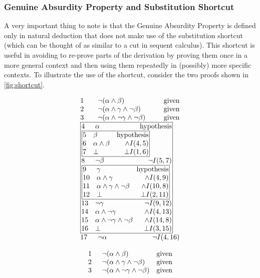 \documentclass[11pt,twoside,a4paper]{report}
\begin{document}
\subsubsection{Genuine Absurdity Property and Substitution Shortcut}
A very important thing to note is that the Genuine Absurdity Property is defined only in natural deduction that does not make use of the substitution shortcut (which can be thought of as similar to a cut in sequent calculus). This shortcut is useful in avoiding to re-prove parts of the derivation by proving them once in a more general context and then using them repeatedly in (possibly) more specific contexts. To illustrate the use of the shortcut, consider the two proofs shown in \autoref{fig:shortcut}.

\begin{figure}[htp]
\begin{minipage}[c]{.5\linewidth}
\[\vbox{\offinterlineskip\halign{
&\tabskip=1.5em#\strut&$#$\hfil\tabskip=1em&\hfil$#$\tabskip=0em\cr
%
1&\neg(\alpha\wedge\beta)&\mbox{given}\cr
2&\neg(\alpha\wedge\gamma\wedge\neg\beta)&\mbox{given}\cr
3&\neg(\alpha\wedge\neg\gamma\wedge\neg\beta)&\mbox{given}\cr
%
\multispan3\vbox{\halign{
\vrule#&&\hskip.1em\tabskip=1em#\strut&$#$\hfil\tabskip=1em&\hfil$#$\hskip0.1em\tabskip=0em&\vrule#\cr
\noalign{\hrule}
%
&4&\alpha&\mbox{hypothesis}&\cr
%
&\multispan3\,\vbox{\halign{
\vrule#&&\hskip.1em\tabskip=1em#\strut&$#$\hfil\tabskip=1em&\hfil$#$\hskip0.1em\tabskip=0em&\vrule#\cr
\noalign{\hrule}
%
&5&\beta&\mbox{hypothesis}&\cr
&6&\alpha\wedge\beta&\wedge I(4,5)&\cr
&7&\bot&\bot I(1,6)&\cr
%
\noalign{\hrule}}}\,&\cr
%
&8&\neg\beta&\neg I(5,7)&\cr
%
&\multispan3\,\vbox{\halign{
\vrule#&&\hskip.1em\tabskip=1em#\strut&$#$\hfil\tabskip=1em&\hfil$#$\hskip0.1em\tabskip=0em&\vrule#\cr
\noalign{\hrule}
%
&9&\gamma&\mbox{hypothesis}&\cr
&10&\alpha\wedge\gamma&\wedge I(4,9)&\cr
&11&\alpha\wedge\gamma\wedge\neg\beta&\wedge I(10,8)&\cr
&12&\bot&\bot I(2,11)&\cr
%
\noalign{\hrule}}}\,&\cr
%
&13&\neg\gamma&\neg I(9,12)&\cr
&14&\alpha\wedge\neg\gamma&\wedge I(4,13)&\cr
&15&\alpha\wedge\neg\gamma\wedge\neg\beta&\wedge I(14,8)&\cr
&16&\bot&\bot I(3,15)&\cr
%
\noalign{\hrule}}}\,\cr
%
17&\neg\alpha&\neg I(4,16)\cr
}}\]
\end{minipage}%
\begin{minipage}[c]{.5\linewidth}
\[\vbox{\offinterlineskip\halign{
&\tabskip=1.5em#\strut&$#$\hfil\tabskip=1em&\hfil$#$\tabskip=0em\cr
%
1&\neg(\alpha\wedge\beta)&\mbox{given}\cr
2&\neg(\alpha\wedge\gamma\wedge\neg\beta)&\mbox{given}\cr
3&\neg(\alpha\wedge\neg\gamma\wedge\neg\beta)&\mbox{given}\cr
}}\]
\end{minipage}
\end{figure}
\end{document}
